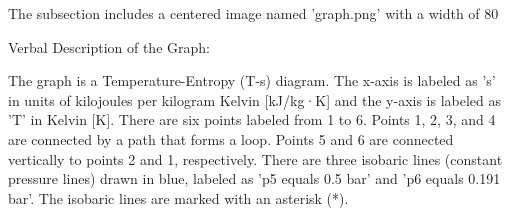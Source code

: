 The subsection includes a centered image named 'graph.png' with a width of 80%

Verbal Description of the Graph:

The graph is a Temperature-Entropy (T-s) diagram. The x-axis is labeled as 's' in units of kilojoules per kilogram Kelvin [kJ/kg·K] and the y-axis is labeled as 'T' in Kelvin [K]. There are six points labeled from 1 to 6. Points 1, 2, 3, and 4 are connected by a path that forms a loop. Points 5 and 6 are connected vertically to points 2 and 1, respectively. There are three isobaric lines (constant pressure lines) drawn in blue, labeled as 'p5 equals 0.5 bar' and 'p6 equals 0.191 bar'. The isobaric lines are marked with an asterisk (*).